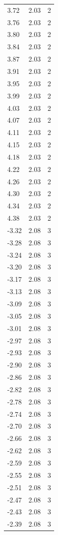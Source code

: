 \begin{longtable}{lrr}
  3.72 & 2.03 & 2 \\
  3.76 & 2.03 & 2 \\
  3.80 & 2.03 & 2 \\
  3.84 & 2.03 & 2 \\
  3.87 & 2.03 & 2 \\
  3.91 & 2.03 & 2 \\
  3.95 & 2.03 & 2 \\
  3.99 & 2.03 & 2 \\
  4.03 & 2.03 & 2 \\
  4.07 & 2.03 & 2 \\
  4.11 & 2.03 & 2 \\
  4.15 & 2.03 & 2 \\
  4.18 & 2.03 & 2 \\
  4.22 & 2.03 & 2 \\
  4.26 & 2.03 & 2 \\
  4.30 & 2.03 & 2 \\
  4.34 & 2.03 & 2 \\
  4.38 & 2.03 & 2 \\
  -3.32 & 2.08 & 3 \\
  -3.28 & 2.08 & 3 \\
  -3.24 & 2.08 & 3 \\
  -3.20 & 2.08 & 3 \\
  -3.17 & 2.08 & 3 \\
  -3.13 & 2.08 & 3 \\
  -3.09 & 2.08 & 3 \\
  -3.05 & 2.08 & 3 \\
  -3.01 & 2.08 & 3 \\
  -2.97 & 2.08 & 3 \\
  -2.93 & 2.08 & 3 \\
  -2.90 & 2.08 & 3 \\
  -2.86 & 2.08 & 3 \\
  -2.82 & 2.08 & 3 \\
  -2.78 & 2.08 & 3 \\
  -2.74 & 2.08 & 3 \\
  -2.70 & 2.08 & 3 \\
  -2.66 & 2.08 & 3 \\
  -2.62 & 2.08 & 3 \\
  -2.59 & 2.08 & 3 \\
  -2.55 & 2.08 & 3 \\
  -2.51 & 2.08 & 3 \\
  -2.47 & 2.08 & 3 \\
  -2.43 & 2.08 & 3 \\
  -2.39 & 2.08 & 3 \\

\end{longtable}
